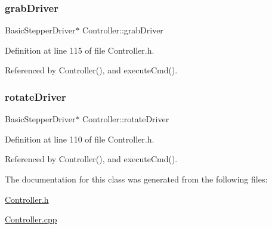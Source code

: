 \subsubsection{\texorpdfstring{grab\+Driver}{grabDriver}}
{\footnotesize\ttfamily Basic\+Stepper\+Driver$\ast$ Controller\+::grab\+Driver\hspace{0.3cm}{\ttfamily [private]}}



Definition at line 115 of file Controller.\+h.



Referenced by Controller(), and execute\+Cmd().

\mbox{\label{class_controller_a5678454b560873dfb3197609f1e86199}} 
\subsubsection{\texorpdfstring{rotate\+Driver}{rotateDriver}}
{\footnotesize\ttfamily Basic\+Stepper\+Driver$\ast$ Controller\+::rotate\+Driver\hspace{0.3cm}{\ttfamily [private]}}



Definition at line 110 of file Controller.\+h.



Referenced by Controller(), and execute\+Cmd().



The documentation for this class was generated from the following files\+:\begin{DoxyCompactItemize}
\item 
\hyperlink{_controller_8h}{Controller.\+h}\item 
\hyperlink{_controller_8cpp}{Controller.\+cpp}\end{DoxyCompactItemize}
